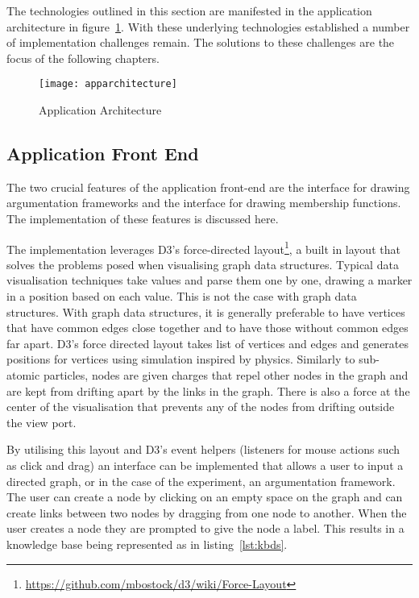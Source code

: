 The technologies outlined in this section are manifested in the application architecture in figure~\ref{fig:AppArch}. With these underlying technologies established a number of implementation challenges remain. The solutions to these challenges are the focus of the following chapters.

\begin{figure}[h]
    \centering
    \texttt{[image: apparchitecture]}
    \caption{Application Architecture}
    \label{fig:AppArch}
\end{figure}

\subsection{Application Front End}

The two crucial features of the application front-end are the interface for drawing argumentation frameworks and the interface for drawing membership functions. The implementation of these features is discussed here.

The implementation leverages D3's force-directed layout\footnote{\url{https://github.com/mbostock/d3/wiki/Force-Layout}}, a built in layout that solves the problems posed when visualising graph data structures. Typical data visualisation techniques take values and parse them one by one, drawing a marker in a position based on each value. This is not the case with graph data structures. With graph data structures, it is generally preferable to have vertices that have common edges close together and to have those without common edges far apart. D3's force directed layout takes list of vertices and edges and generates positions for vertices using simulation inspired by physics. Similarly to sub-atomic particles, nodes are given charges that repel other nodes in the graph and are kept from drifting apart by the links in the graph. There is also a force at the center of the visualisation that prevents any of the nodes from drifting outside the view port. 

By utilising this layout and D3's event helpers (listeners for mouse actions such as click and drag) an interface can be implemented that allows a user to input a directed graph, or in the case of the experiment, an argumentation framework. The user can create a node by clicking on an empty space on the graph and can create links between two nodes by dragging from one node to another. When the user creates a node they are prompted to give the node a label. This results in a knowledge base being represented as in listing~\ref{lst:kbds}.


